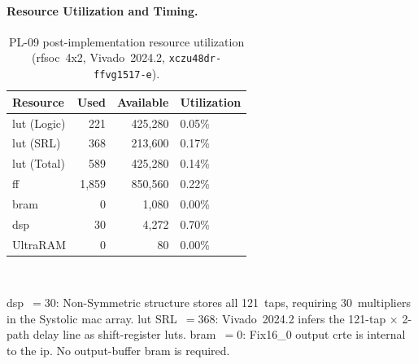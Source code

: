 
\FloatBarrier
\paragraph{Resource Utilization and Timing.}

\leavevmode\par
\begin{table}[!h]
  \caption{PL-09 post-implementation resource utilization
           (\ac{rfsoc}~4x2, Vivado~2024.2,
           \texttt{xczu48dr\allowbreak-ffvg1517\allowbreak-e}).}
  \label{tab:pl09_resources}
  \centering
  \begin{tabular}{lrrl}
    \hline
    Resource & Used & Available & Utilization \\
    \hline
    \ac{lut} (Logic) &     221 & 425{,}280 & 0.05\% \\[2pt]
    \ac{lut} (SRL)   &     368 & 213{,}600 & 0.17\% \\[2pt]
    \ac{lut} (Total) &     589 & 425{,}280 & 0.14\% \\[2pt]
    \ac{ff}          & 1{,}859 & 850{,}560 & 0.22\% \\[2pt]
    \ac{bram}        &       0 & 1{,}080   & 0.00\% \\[2pt]
    \ac{dsp}         &      30 & 4{,}272   & 0.70\% \\[2pt]
    UltraRAM         &       0 & 80        & 0.00\% \\
    \hline
  \end{tabular}\\[4pt]
  \begin{minipage}{\linewidth}
    \small
    \ac{dsp}~$= 30$: Non-Symmetric structure stores all 121~taps, requiring
    30~multipliers in the Systolic \ac{mac} array.
    \ac{lut} SRL~$= 368$: Vivado~2024.2 infers the 121-tap $\times$ 2-path
    delay line as shift-register \acp{lut}.
    \ac{bram}~$= 0$: Fix16\_0 output \ac{crte} is internal to the \ac{ip}.
    No output-buffer \ac{bram} is required.
  \end{minipage}
\end{table}

